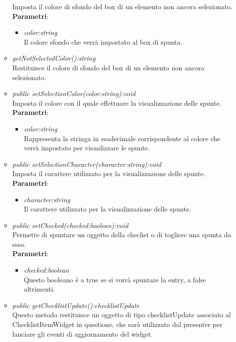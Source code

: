 \begin{itemize}
\begin{itemize}
		Imposta il colore di sfondo del box di un elemento non ancora selezionato.
		\\ \textbf{Parametri}: \begin{itemize}
		\item \textit{color:string}\\
		Il colore sfondo che verrà impostato al box di spunta.
		\end{itemize}
		\item \textit{getNotSelectedColor():string}\\
		Restituisce il colore di sfondo del box di un elemento non ancora selezionato.
	\item \textit{public setSelectionColor(color:string):void}\\
	Imposta il colore con il quale effettuare la visualizzazione delle spunte.
		\\ \textbf{Parametri}: \begin{itemize}
		\item \textit{color:string}\\
		Rappresenta la stringa in esadecimale corrispondente al colore che verrà impostato per visualizzare le spunte.
		\end{itemize}  
	\item \textit{public setSelectionCharacter(character:string):void}\\
	Imposta il carattere utilizzato per la visualizzazione delle spunte.
		\\ \textbf{Parametri}: \begin{itemize}
		\item \textit{character:string}\\
		Il carattere utilizzato per la visualizzazione delle spunte.
		\end{itemize} 
	\item \textit{public setChecked(checked:boolean):void}\\
	Permette di spuntare un oggetto della checlist o di togliere una spunta da esso.
		\\ \textbf{Parametri}: \begin{itemize}
		\item \textit{checked:boolean}\\
		Questo booleano è a true se si vorrà spuntare la entry, a false altrimenti.
		\end{itemize}  
	\item \textit{public getChecklistUpdate():checklistUpdate}\\
	Questo metodo restituisce un oggetto di tipo checklistUpdate associato al ChecklistItemWidget in questione, che sarà utilizzato dal presenter per lanciare gli eventi di aggiornamento del widget.

\end{itemize}
\end{itemize}
